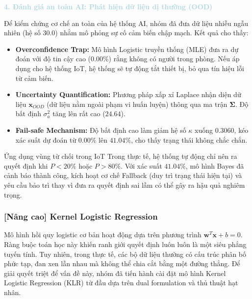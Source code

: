 \vspace{0.5em}
\noindent\textcolor{lightblue}{\textbf{4. Đánh giá an toàn AI: Phát hiện dữ liệu dị thường (OOD)}}
\vspace{0.5em}

Để kiểm chứng cơ chế an toàn của hệ thống AI, nhóm đã đưa dữ liệu nhiễu ngẫu nhiên (hệ số $30.0$) nhằm mô phỏng sự cố cảm biến chập mạch. Kết quả cho thấy:
\begin{itemize}
    \item \textbf{Overconfidence Trap:} Mô hình Logistic truyền thống (MLE) đưa ra dự đoán với độ tin cậy cao ($0.00\%$) rằng không có người trong phòng. Nếu áp dụng cho hệ thống IoT, hệ thống sẽ tự động tắt thiết bị, bỏ qua tín hiệu lỗi từ cảm biến.
    \item \textbf{Uncertainty Quantification:} Phương pháp xấp xỉ Laplace nhận diện dữ liệu $\mathbf{x}_{OOD}$ (dữ liệu nằm ngoài phạm vi huấn luyện) thông qua ma trận $\mathbf{\Sigma}$. Độ bất định $\sigma_a^2$ tăng lên rất cao ($24.64$).
    \item \textbf{Fail-safe Mechanism:} Độ bất định cao làm giảm hệ số $\kappa$ xuống $0.3060$, kéo xác suất dự đoán từ $0.00\%$ lên \textbf{$41.04\%$}, cho thấy trạng thái không chắc chắn.
\end{itemize}

\begin{infobox}{Ứng dụng vùng từ chối trong IoT}
Trong thực tế, hệ thống tự động chỉ nên ra quyết định khi $P < 20\%$ hoặc $P > 80\%$. Với xác suất $41.04\%$, mô hình Bayes đã cảnh báo thành công, kích hoạt cơ chế Fallback (duy trì trạng thái hiện tại) và yêu cầu bảo trì thay vì đưa ra quyết định sai lầm có thể gây ra hậu quả nghiêm trọng.
\end{infobox}

\subsubsection{[Nâng cao] Kernel Logistic Regression}

Mô hình hồi quy logistic cơ bản hoạt động dựa trên phương trình $\mathbf{w}^T\mathbf{x} + b = 0$. Ràng buộc toán học này khiến ranh giới quyết định luôn luôn là một siêu phẳng tuyến tính. Tuy nhiên, trong thực tế, các bộ dữ liệu thường có cấu trúc phân bố phức tạp, đan xen lẫn nhau mà không thể chia cắt bằng một đường thẳng. Để giải quyết triệt để vấn đề này, nhóm đã tiến hành cài đặt mô hình Kernel Logistic Regression (KLR) từ đầu dựa trên dual formulation và thủ thuật hạt nhân.

